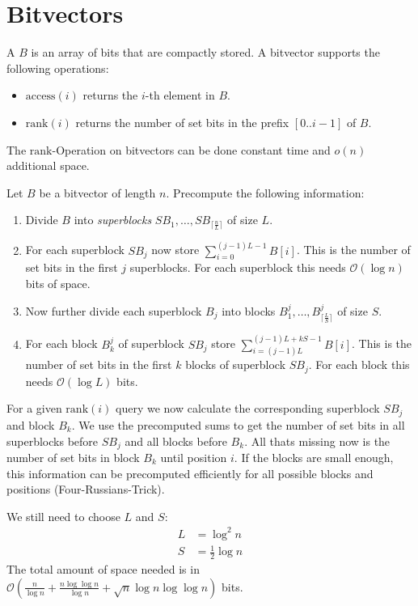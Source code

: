 \section{Bitvectors}

\begin{Definition}
  A  $B$ is an array of bits that are compactly stored. A bitvector supports the following operations:
  \begin{itemize}
    \item $\mathrm{access}(i)$ returns the $i$-th element in $B$.
    \item $\mathrm{rank}(i)$ returns the number of set bits in the prefix $[0..i-1]$ of $B$.
  \end{itemize}
\end{Definition}

\begin{Theorem}
  The $\mathrm{rank}$-Operation on bitvectors can be done constant time and $o(n)$ additional space.\cite{Jacobson1989}
\end{Theorem}

\begin{Proof}
  Let $B$ be a bitvector of length $n$. Precompute the following information:
  \begin{enumerate}
    \item Divide $B$ into \emph{superblocks} $SB_1, \ldots, SB_{\lceil \frac{n}{L} \rceil}$ of size $L$.
    \item For each superblock $SB_j$ now store $\sum_{i=0}^{(j-1)L-1} B[i]$. This is the number of set bits in the first $j$ superblocks. For each superblock this needs $\mathcal{O}(\log n)$ bits of space.
    \item Now further divide each superblock $B_j$ into blocks $B_1^j, \ldots, B_{\lceil \frac{L}{S} \rceil}^j$ of size $S$.
    \item For each block $B_k^j$ of superblock $SB_j$ store $\sum_{i=(j-1)L}^{(j-1)L+kS-1} B[i]$. This is the number of set bits in the first $k$ blocks of superblock $SB_j$. For each block this needs $\mathcal{O}(\log L)$ bits.
  \end{enumerate}
  For a given $\mathrm{rank}(i)$ query we now calculate the corresponding superblock $SB_j$ and block $B_k$. We use the precomputed sums to get the number of set bits in all superblocks before $SB_j$ and all blocks before $B_k$. All thats missing now is the number of set bits in block $B_k$ until position $i$. If the blocks are small enough, this information can be precomputed efficiently for all possible blocks and positions (Four-Russians-Trick).

  We still need to choose $L$ and $S$:
  \begin{align}
    L &= \log^2 n \\
    S &= \frac{1}{2} \log n
  \end{align}
  The total amount of space needed is in $\mathcal{O}(\frac{n}{\log n} + \frac{n\log\log n}{\log n} + \sqrt{n}\log n\log\log n)$ bits.
\end{Proof}
